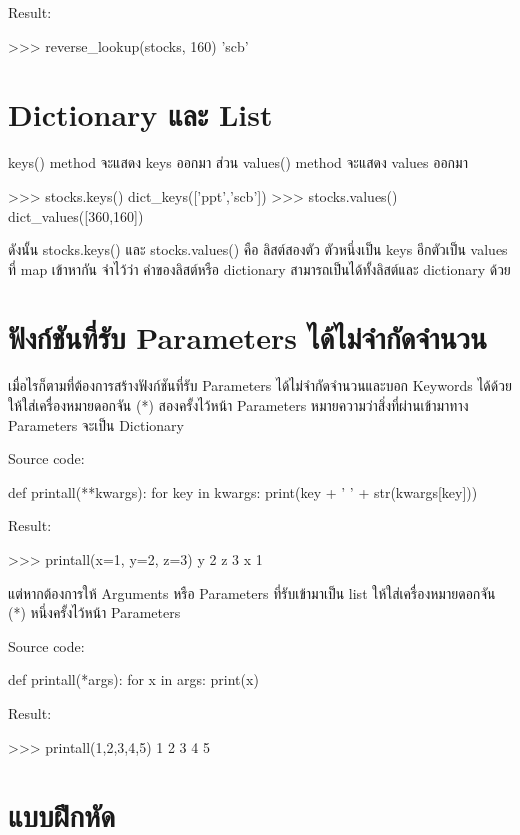 Result:
\begin{codelist}{}{}
>>> reverse_lookup(stocks, 160)
'scb'
\end{codelist}


\section{Dictionary และ List}

keys() method จะแสดง keys ออกมา ส่วน values() method จะแสดง values ออกมา 

\begin{codelist}{}{}
>>> stocks.keys()
dict_keys(['ppt','scb'])
>>> stocks.values()
dict_values([360,160])
\end{codelist}


ดังนั้น stocks.keys() และ stocks.values() คือ ลิสต์สองตัว ตัวหนึ่งเป็น keys อีกตัวเป็น values ที่ map เข้าหากัน จำไว้ว่า ค่าของลิสต์หรือ dictionary สามารถเป็นได้ทั้งลิสต์และ dictionary ด้วย

\section{ฟังก์ชันที่รับ Parameters ได้ไม่จำกัดจำนวน }

เมื่อไรก็ตามที่ต้องการสร้างฟังก์ชันที่รับ Parameters ได้ไม่จำกัดจำนวนและบอก Keywords ได้ด้วย ให้ใส่เครื่องหมายดอกจัน (*) สองครั้งไว้หน้า Parameters หมายความว่าสิ่งที่ผ่านเข้ามาทาง Parameters จะเป็น Dictionary 

Source code:
\begin{codelist}{}{}
def printall(**kwargs):
    for key in kwargs:
        print(key + ' ' + str(kwargs[key]))
\end{codelist}
Result:
\begin{codelist}{}{}
>>> printall(x=1, y=2, z=3)
y 2
z 3
x 1
\end{codelist}

แต่หากต้องการให้ Arguments หรือ Parameters ที่รับเข้ามาเป็น list ให้ใส่เครื่องหมายดอกจัน (*) หนึ่งครั้งไว้หน้า Parameters 

Source code:
\begin{codelist}{}{}
def printall(*args):
    for x in args:
        print(x)
\end{codelist}
Result:
\begin{codelist}{}{}
>>> printall(1,2,3,4,5)
1
2
3
4
5
\end{codelist}

\section{แบบฝึกหัด}

